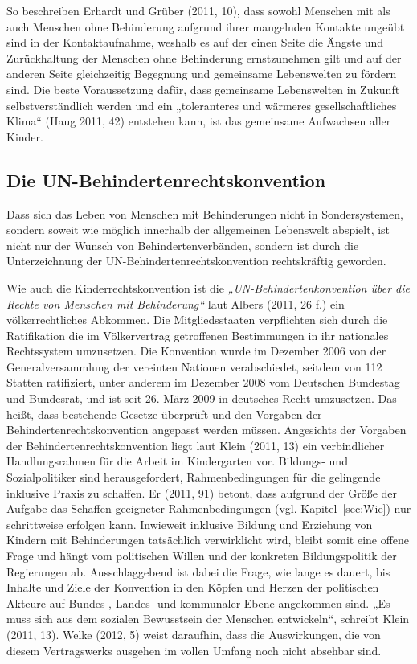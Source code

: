 So beschreiben Erhardt und Grüber (2011, 10), dass sowohl Menschen mit als auch Menschen ohne Behinderung aufgrund ihrer mangelnden Kontakte ungeübt sind in der Kontaktaufnahme, weshalb es auf der einen Seite die Ängste und Zurückhaltung der Menschen ohne Behinderung ernstzunehmen gilt und auf der anderen Seite gleichzeitig Begegnung und gemeinsame Lebenswelten zu fördern sind. Die beste Voraussetzung dafür, dass gemeinsame Lebenswelten in Zukunft selbstverständlich werden und ein „toleranteres und wärmeres gesellschaftliches Klima“ (Haug 2011, 42) entstehen kann, ist das gemeinsame Aufwachsen aller Kinder. 

\subsection{Die UN-Behindertenrechtskonvention}
\label{sec:BRK}
Dass sich das Leben von Menschen mit Behinderungen nicht in Sondersystemen, sondern soweit wie möglich innerhalb der allgemeinen Lebenswelt abspielt, ist nicht nur der Wunsch von Behindertenverbänden, sondern ist durch die Unterzeichnung der UN-Behindertenrechtskonvention rechtskräftig geworden. 

Wie auch die Kinderrechtskonvention ist die \emph{„UN-Behindertenkonvention über die Rechte von Menschen mit Behinderung“} laut Albers (2011, 26 f.) ein völkerrechtliches Abkommen. Die Mitgliedsstaaten verpflichten sich durch die Ratifikation die im Völkervertrag getroffenen Bestimmungen in ihr nationales Rechtssystem umzusetzen. Die Konvention wurde im Dezember 2006 von der Generalversammlung der vereinten Nationen verabschiedet, seitdem von 112 Statten ratifiziert, unter anderem im Dezember 2008 vom Deutschen Bundestag und Bundesrat, und ist seit 26. März 2009 in deutsches Recht umzusetzen. Das heißt, dass bestehende Gesetze überprüft und den Vorgaben der Behindertenrechtskonvention angepasst werden müssen.  Angesichts der Vorgaben der Behindertenrechtskonvention liegt laut Klein (2011, 13) ein verbindlicher Handlungsrahmen für die Arbeit im Kindergarten vor. Bildungs- und Sozialpolitiker sind herausgefordert, Rahmenbedingungen für die gelingende inklusive Praxis zu schaffen. Er (2011, 91) betont, dass aufgrund der Größe der Aufgabe das Schaffen geeigneter Rahmenbedingungen (vgl. Kapitel~\ref{sec:Wie}) nur schrittweise erfolgen kann. Inwieweit inklusive Bildung und Erziehung von Kindern mit Behinderungen tatsächlich verwirklicht wird, bleibt somit eine offene Frage und hängt vom politischen Willen und der konkreten Bildungspolitik der Regierungen ab. Ausschlaggebend ist dabei die Frage, wie lange es dauert, bis Inhalte und Ziele der Konvention in den Köpfen und Herzen der politischen Akteure auf Bundes-, Landes- und kommunaler Ebene angekommen sind. „Es muss sich aus dem sozialen Bewusstsein der Menschen entwickeln“, schreibt Klein (2011, 13). Welke (2012, 5) weist daraufhin, dass die Auswirkungen, die von diesem Vertragswerks ausgehen im vollen Umfang noch nicht absehbar sind. 

